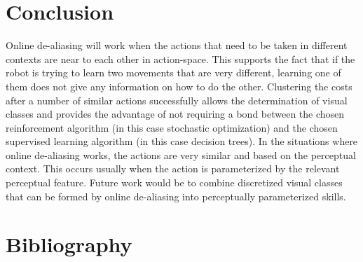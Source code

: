 \documentclass[12pt]{article}
\begin{document}
\section{Conclusion}

Online de-aliasing will work when the actions that need to be taken in different contexts are near to each other in action-space. This supports the fact that if the robot is trying to learn two movements that are very different, learning one of them does not give any information on how to do the other. Clustering the costs after a number of similar actions successfully allows the determination of visual classes and provides the advantage of not requiring a bond between the chosen reinforcement algorithm (in this case stochastic optimization) and the chosen supervised learning algorithm (in this case decision trees). In the situations where online de-aliasing works, the actions are very similar and based on the perceptual context. This occurs usually when the action is parameterized by the relevant perceptual feature. Future work would be to combine discretized visual classes that can be formed by online de-aliasing into perceptually parameterized skills.

\section{Bibliography}


\end{document}
